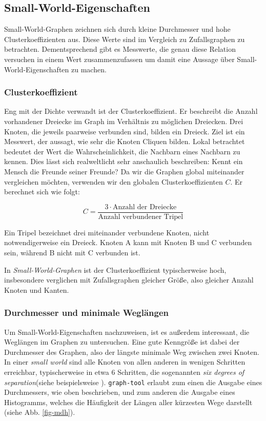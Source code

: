 \documentclass[11pt, a4paper]{article}
\begin{document}
\subsection{Small-World-Eigenschaften}
Small-World-Graphen zeichnen sich durch kleine Durchmesser und hohe Clusterkoeffizienten aus. Diese Werte sind im Vergleich zu Zufallsgraphen zu betrachten. Dementsprechend gibt es Messwerte, die genau diese Relation versuchen in einem Wert zusammenzufassen um damit eine Aussage über Small-World-Eigenschaften zu machen. 


\subsubsection{Clusterkoeffizient}

Eng mit der Dichte verwandt ist der Clusterkoeffizient. Er beschreibt die
Anzahl vorhandener Dreiecke im Graph im Verhältnis zu möglichen Dreiecken. Drei
Knoten, die jeweils paarweise verbunden sind, bilden ein Dreieck. Ziel ist ein
Messwert, der aussagt, wie sehr die Knoten Cliquen bilden. Lokal betrachtet
bedeutet der Wert die Wahrscheinlichkeit, die Nachbarn eines Nachbarn zu kennen.
Dies lässt sich realweltlicht sehr anschaulich beschreiben: Kennt ein Mensch die 
Freunde seiner Freunde?
Da wir die Graphen global miteinander vergleichen möchten, verwenden wir den
globalen Clusterkoeffizienten $C$. Er berechnet sich wie folgt:

$$
    C = \frac{3\cdot\text{Anzahl der Dreiecke}}{\text{Anzahl verbundener Tripel}}
$$

Ein Tripel bezeichnet drei miteinander verbundene Knoten, nicht
notwendigerweise ein Dreieck. Knoten A kann mit Knoten B und C verbunden sein,
während B nicht mit C verbunden ist.

In \emph{Small-World-Graphen} ist der Clusterkoeffizient typischerweise hoch, 
insbesondere verglichen mit Zufallsgraphen gleicher Größe, also gleicher Anzahl
Knoten und Kanten\cite{Newman2003}.\\


\subsubsection{Durchmesser und minimale Wegl\"angen}
Um Small-World-Eigenschaften nachzuweisen, ist es außerdem interessant, die
Weglängen im Graphen zu untersuchen. Eine gute Kenngröße ist dabei der Durchmesser
des Graphen, also der längste minimale Weg zwischen zwei Knoten. In einer
\emph{small world} sind alle Knoten von allen anderen in wenigen Schritten
erreichbar, typischerweise in etwa 6 Schritten, die sogenannten 
\emph{six degrees of separation}(siehe beispielsweise \cite{Newman2003}). 
\texttt{graph-tool} erlaubt zum einen die Ausgabe eines Durchmessers, wie oben
 beschrieben, und zum anderen die Ausgabe eines Histogramms, welches die 
Häufigkeit der Längen aller kürzesten Wege darstellt (siehe Abb. \ref{fig-mdh}).
\end{document}
